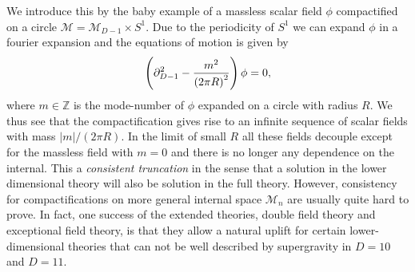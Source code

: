 We introduce this by the baby example of a massless scalar field $\phi$ compactified on a circle $\mathcal{M}=\mathcal{M}_{D-1}\times S^1$. Due to the periodicity of $S^1$ we can expand $\phi$ in a fourier expansion and the equations of motion is given by 
\begin{equation}
    \left(\partial^2_{D-1}-\frac{m^2}{\left(2\pi R\right)^2}\right)\phi = 0,
\end{equation}
where $m\in\mathbb{Z}$ is the mode-number of $\phi$ expanded on a circle with radius $R$. We thus see that the compactification gives rise to an infinite sequence of scalar fields with mass $|m|/(2\pi R)$. In the limit of small $R$ all these fields decouple except for the massless field with $m=0$ and there is no longer any dependence on the internal. This a \emph{consistent truncation} in the sense that a solution in the lower dimensional theory will also be solution in the full theory. However, consistency for compactifications on more general internal space $\mathcal{M}_n$ are usually quite hard to prove. In fact, one success of the extended theories, double field theory and exceptional field theory, is that they allow a natural uplift for certain lower-dimensional theories that can not be well described by supergravity in $D=10$ and $D=11$. 


